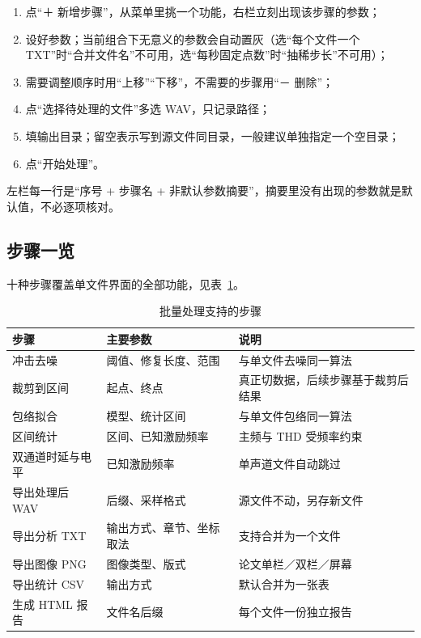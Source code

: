\documentclass[UTF8,a4paper,12pt,scheme=chinese]{ctexart}
\begin{document}
\begin{enumerate}
  \item 点“＋ 新增步骤”，从菜单里挑一个功能，右栏立刻出现该步骤的参数；
  \item 设好参数；当前组合下无意义的参数会自动置灰（选“每个文件一个 TXT”时“合并文件名”不可用，选“每秒固定点数”时“抽稀步长”不可用）；
  \item 需要调整顺序时用“上移”“下移”，不需要的步骤用“－ 删除”；
  \item 点“选择待处理的文件”多选 WAV，只记录路径；
  \item 填输出目录；留空表示写到源文件同目录，一般建议单独指定一个空目录；
  \item 点“开始处理”。
\end{enumerate}

左栏每一行是“序号 + 步骤名 + 非默认参数摘要”，摘要里没有出现的参数就是默认值，不必逐项核对。

\subsection{步骤一览}

十种步骤覆盖单文件界面的全部功能，见表~\ref{tab:batch_steps}。

\begin{table}[htbp]
\centering
\caption{批量处理支持的步骤}
{\small
\begin{tabular}{@{}>{\raggedright\arraybackslash}p{4.0cm}>{\raggedright\arraybackslash}p{4.6cm}>{\raggedright\arraybackslash}p{5.4cm}@{}}
\toprule
步骤 & 主要参数 & 说明 \\
\midrule
冲击去噪 & 阈值、修复长度、范围 & 与单文件去噪同一算法 \\
裁剪到区间 & 起点、终点 & 真正切数据，后续步骤基于裁剪后结果 \\
包络拟合 & 模型、统计区间 & 与单文件包络同一算法 \\
区间统计 & 区间、已知激励频率 & 主频与 THD 受频率约束 \\
双通道时延与电平 & 已知激励频率 & 单声道文件自动跳过 \\
导出处理后 WAV & 后缀、采样格式 & 源文件不动，另存新文件 \\
导出分析 TXT & 输出方式、章节、坐标取法 & 支持合并为一个文件 \\
导出图像 PNG & 图像类型、版式 & 论文单栏／双栏／屏幕 \\
导出统计 CSV & 输出方式 & 默认合并为一张表 \\
生成 HTML 报告 & 文件名后缀 & 每个文件一份独立报告 \\
\bottomrule
\end{tabular}}
\label{tab:batch_steps}
\end{table}
\end{document}
